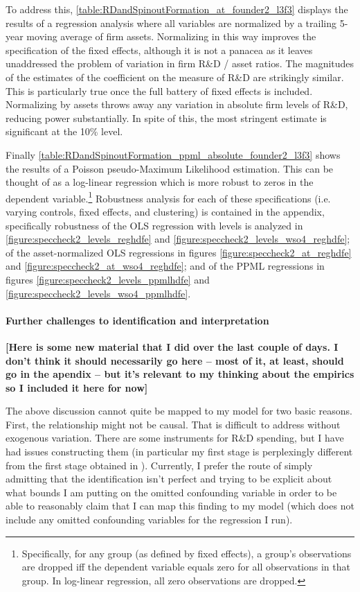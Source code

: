 \documentclass[11pt,english]{article}
\begin{document}
To address this, \autoref{table:RDandSpinoutFormation_at_founder2_l3f3} displays the results of a regression analysis where all variables are normalized by a trailing 5-year moving average of firm assets. Normalizing in this way improves the specification of the fixed effects, although it is not a panacea as it leaves unaddressed the problem of variation in firm R\&D / asset ratios. The magnitudes of the estimates of the coefficient on the measure of R\&D are strikingly similar. This is particularly true once the full battery of fixed effects is included. Normalizing by assets throws away any variation in absolute firm levels of R\&D, reducing power substantially. In spite of this, the most stringent estimate is significant at the 10\% level.

Finally \autoref{table:RDandSpinoutFormation_ppml_absolute_founder2_l3f3} shows the results of a Poisson pseudo-Maximum Likelihood estimation. This can be thought of as a log-linear regression which is more robust to zeros in the dependent variable.\footnote{Specifically, for any group (as defined by fixed effects), a group's observations are dropped iff the dependent variable equals zero for all observations in that group. In log-linear regression, all zero observations are dropped.} Robustness analysis for each of these specifications (i.e. varying controls, fixed effects, and clustering) is contained in the appendix, specifically robustness of the OLS regression with levels is analyzed in \ref{figure:speccheck2_levels_reghdfe} and  \ref{figure:speccheck2_levels_wso4_reghdfe}; of the asset-normalized OLS regressions in figures \ref{figure:speccheck2_at_reghdfe} and \ref{figure:speccheck2_at_wso4_reghdfe}; and of the PPML regressions in figures \ref{figure:speccheck2_levels_ppmlhdfe} and \ref{figure:speccheck2_levels_wso4_ppmlhdfe}.

\paragraph{Further challenges to identification and interpretation}

\textbf{[Here is some new material that I did over the last couple of days. I don't think it should necessarily go here -- most of it, at least, should go in the apendix -- but it's relevant to my thinking about the empirics so I included it here for now]}

The above discussion cannot quite be mapped to my model for two basic reasons. First, the relationship might not be causal. That is difficult to address without exogenous variation. There are some instruments for R\&D spending, but I have had issues constructing them (in particular my first stage is perplexingly different from the first stage obtained in \cite{babina_entrepreneurial_2019}). Currently, I prefer the route of simply admitting that the identification isn't perfect and trying to be explicit about what bounds I am putting on the omitted confounding variable in order to be able to reasonably claim that I can map this finding to my model (which does not include any omitted confounding variables for the regression I run). 
\end{document}
